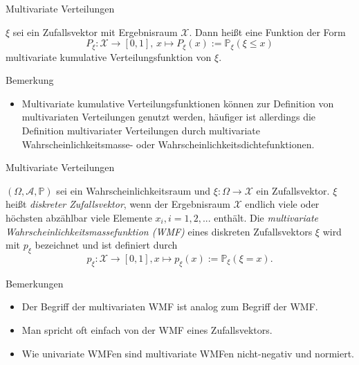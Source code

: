 \documentclass[
  8pt,
  ignorenonframetext,
]{beamer}
\providecommand{\tightlist}{%
  \setlength{\itemsep}{0pt}\setlength{\parskip}{0pt}}
\begin{document}
\begin{frame}{Multivariate Verteilungen}
\protect\hypertarget{multivariate-verteilungen-1}{}
\small
\begin{definition}
$\xi$ sei ein Zufallsvektor mit Ergebnisraum $\mathcal{X}$. Dann heißt eine Funktion
der Form
\begin{equation}
P_\xi : \mathcal{X} \to [0,1],\, x \mapsto P_\xi(x) := \mathbb{P}_\xi(\xi \le x)
\end{equation}
multivariate kumulative Verteilungsfunktion von $\xi$.
\end{definition}

Bemerkung

\begin{itemize}
\tightlist
\item
  \justifying Multivariate kumulative Verteilungsfunktionen können zur
  Definition von multivariaten Verteilungen genutzt werden, häufiger ist
  allerdings die Definition multivariater Verteilungen durch
  multivariate Wahrscheinlichkeitsmasse- oder
  Wahrscheinlichkeitsdichtefunktionen.
\end{itemize}
\end{frame}

\begin{frame}{Multivariate Verteilungen}
\protect\hypertarget{multivariate-verteilungen-2}{}
\small
\begin{definition}
\justifying
$(\Omega,\mathcal{A},\mathbb{P})$ sei ein Wahrscheinlichkeitsraum und 
$\xi:\Omega \to \mathcal{X}$ ein Zufallsvektor. $\xi$ heißt \textit{diskreter Zufallsvektor}, 
wenn der Ergebnisraum $\mathcal{X}$ endlich viele oder höchsten abzählbar viele 
Elemente $x_i, i = 1,2,...$ enthält. Die \textit{multivariate 
Wahrscheinlichkeitsmassefunktion (WMF)} eines diskreten Zufallsvektors $\xi$ wird 
mit $p_\xi$ bezeichnet und ist definiert durch
\begin{equation}
p_\xi : \mathcal{X} \to [0,1], x \mapsto p_\xi(x) := \mathbb{P}_\xi(\xi = x).
\end{equation}
\end{definition}

Bemerkungen

\begin{itemize}
\tightlist
\item
  Der Begriff der multivariaten WMF ist analog zum Begriff der WMF.
\item
  Man spricht oft einfach von der WMF eines Zufallsvektors.
\item
  Wie univariate WMFen sind multivariate WMFen nicht-negativ und
  normiert.
\end{itemize}
\end{frame}
\end{document}
